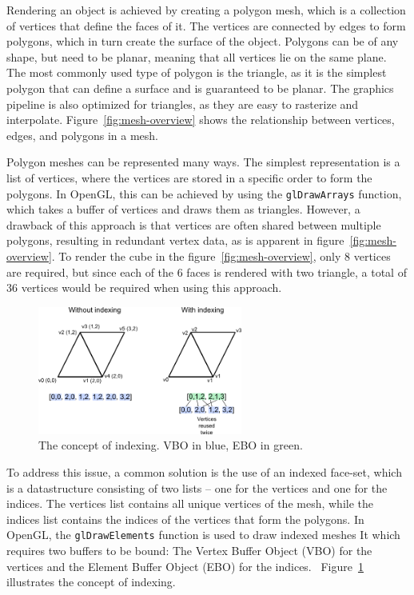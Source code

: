Rendering an object is achieved by creating a polygon mesh, which is a collection of vertices that define the faces of it.
The vertices are connected by edges to form polygons, which in turn create the surface of the object.
Polygons can be of any shape, but need to be planar, meaning that all vertices lie on the same plane.
The most commonly used type of polygon is the triangle, as it is the simplest polygon that can define a surface and is guaranteed to be planar.
The graphics pipeline is also optimized for triangles, as they are easy to rasterize and interpolate.
Figure~\ref{fig:mesh-overview} shows the relationship between vertices, edges, and polygons in a mesh. \cite{dorner_virtual_2019}

Polygon meshes can be represented many ways.
The simplest representation is a list of vertices, where the vertices are stored in a specific order to form the polygons.
In OpenGL, this can be achieved by using the \texttt{glDrawArrays} function,
which takes a buffer of vertices and draws them as triangles.
However, a drawback of this approach is that vertices are often shared between multiple polygons,
resulting in redundant vertex data, as is apparent in figure~\ref{fig:mesh-overview}.
To render the cube in the figure~\ref{fig:mesh-overview}, only 8 vertices are required,
but since each of the 6 faces is rendered with two triangle,
a total of 36 vertices would be required when using this approach.~\cite{dorner_virtual_2019, de_vries_learn_2020}


\begin{figure}[h]
    \centering
    \includegraphics[width=0.60\textwidth]{images/index_buffer}
    \caption{The concept of indexing. VBO in blue, EBO in green.}
    \label{fig:index-buffer}
\end{figure}

To address this issue, a common solution is the use of an indexed face-set, which is a datastructure consisting
of two lists -- one for the vertices and one for the indices.
The vertices list contains all unique vertices of the mesh, while the indices list contains the indices of the vertices that form the polygons.
In OpenGL, the \texttt{glDrawElements} function is used to draw indexed meshes
It which requires two buffers to be bound:
The Vertex Buffer Object (VBO) for the vertices and the Element Buffer Object (EBO) for the indices.~\cite{dorner_virtual_2019, de_vries_learn_2020}
Figure~\ref{fig:index-buffer} illustrates the concept of indexing.

